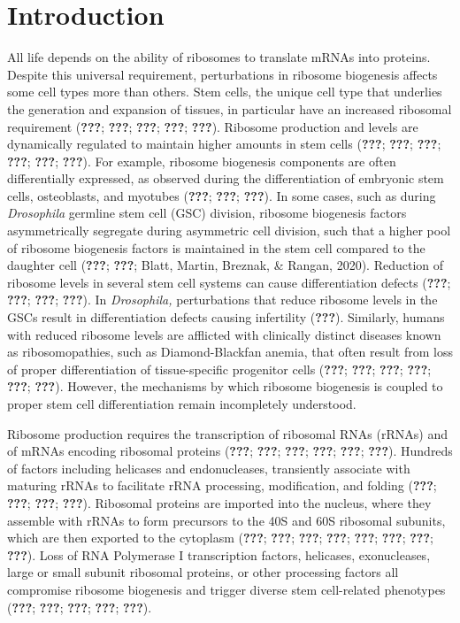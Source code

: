 \documentclass[12pt,oneside]{reedthesis}
\begin{document}
\hypertarget{introduction-1}{%
\section{Introduction}\label{introduction-1}}

All life depends on the ability of ribosomes to translate mRNAs into proteins. Despite this universal requirement, perturbations in ribosome biogenesis affects some cell types more than others. Stem cells, the unique cell type that underlies the generation and expansion of tissues, in particular have an increased ribosomal requirement ({\textbf{???}}; {\textbf{???}}; {\textbf{???}}; {\textbf{???}}; {\textbf{???}}). Ribosome production and levels are dynamically regulated to maintain higher amounts in stem cells ({\textbf{???}}; {\textbf{???}}; {\textbf{???}}; {\textbf{???}}; {\textbf{???}}; {\textbf{???}}). For example, ribosome biogenesis components are often differentially expressed, as observed during the differentiation of embryonic stem cells, osteoblasts, and myotubes ({\textbf{???}}; {\textbf{???}}; {\textbf{???}}). In some cases, such as during \emph{Drosophila} germline stem cell (GSC) division, ribosome biogenesis factors asymmetrically segregate during asymmetric cell division, such that a higher pool of ribosome biogenesis factors is maintained in the stem cell compared to the daughter cell ({\textbf{???}}; {\textbf{???}}; Blatt, Martin, Breznak, \& Rangan, 2020). Reduction of ribosome levels in several stem cell systems can cause differentiation defects ({\textbf{???}}; {\textbf{???}}; {\textbf{???}}; {\textbf{???}}). In \emph{Drosophila,} perturbations that reduce ribosome levels in the GSCs result in differentiation defects causing infertility ({\textbf{???}}). Similarly, humans with reduced ribosome levels are afflicted with clinically distinct diseases known as ribosomopathies, such as Diamond-Blackfan anemia, that often result from loss of proper differentiation of tissue-specific progenitor cells ({\textbf{???}}; {\textbf{???}}; {\textbf{???}}; {\textbf{???}}; {\textbf{???}}; {\textbf{???}}). However, the mechanisms by which ribosome biogenesis is coupled to proper stem cell differentiation remain incompletely understood.

Ribosome production requires the transcription of ribosomal RNAs (rRNAs) and of mRNAs encoding ribosomal proteins ({\textbf{???}}; {\textbf{???}}; {\textbf{???}}; {\textbf{???}}; {\textbf{???}}; {\textbf{???}}). Hundreds of factors including helicases and endonucleases, transiently associate with maturing rRNAs to facilitate rRNA processing, modification, and folding ({\textbf{???}}; {\textbf{???}}; {\textbf{???}}; {\textbf{???}}). Ribosomal proteins are imported into the nucleus, where they assemble with rRNAs to form precursors to the 40S and 60S ribosomal subunits, which are then exported to the cytoplasm ({\textbf{???}}; {\textbf{???}}; {\textbf{???}}; {\textbf{???}}; {\textbf{???}}; {\textbf{???}}; {\textbf{???}}; {\textbf{???}}). Loss of RNA Polymerase I transcription factors, helicases, exonucleases, large or small subunit ribosomal proteins, or other processing factors all compromise ribosome biogenesis and trigger diverse stem cell-related phenotypes ({\textbf{???}}; {\textbf{???}}; {\textbf{???}}; {\textbf{???}}; {\textbf{???}}).
\end{document}
